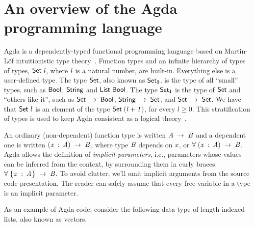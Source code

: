 \documentclass[review]{elsarticle}
\theoremstyle{definition}
\renewcommand{\geq}{\geqslant}
\newcommand{\D}[1]{\blue{\mathsf{#1}}}
\newcommand{\V}[1]{\purple{\mathit{#1}}}
\begin{document}

\section{An overview of the Agda programming language}\label{sec:agda}



Agda is a dependently-typed functional programming language based on
Martin-L\"of intuitionistic type theory~\cite{Lof98}.  Function types
and an infinite hierarchy of types of types, \ensuremath{\D{Set}\;\V{l}}, where \ensuremath{\V{l}} is a
natural number, are built-in. Everything else is a user-defined
type. The type \ensuremath{\D{Set}}, also known as \ensuremath{\D{Set}_{\D{0}}}, is the type of all
``small'' types, such as \ensuremath{\D{Bool}}, \ensuremath{\D{String}} and \ensuremath{\D{List}\;\D{Bool}}.  The type
\ensuremath{\D{Set}_{\D{1}}} is the type of \ensuremath{\D{Set}} and ``others like it'', such as \ensuremath{\D{Set}\;\to \;\D{Bool}},
\ensuremath{\D{String}\;\to \;\D{Set}}, and \ensuremath{\D{Set}\;\to \;\D{Set}}. We have that \ensuremath{\D{Set}\;\V{l}} is an
element of the type \ensuremath{\D{Set}\;(\V{l+1})}, for every $l \geq 0$. This
stratification of types is used to keep Agda consistent as a logical
theory~\cite{Sorensen2006}.

An ordinary (non-dependent) function type is written \ensuremath{\V{A}\;\to \;\V{B}} and a
dependent one is written \ensuremath{(\V{x}\;\mathbin{:}\;\V{A})\;\to \;\V{B}}, where type \ensuremath{\V{B}} depends on
\ensuremath{\V{x}}, or \ensuremath{\D{\forall}\;(\V{x}\;\mathbin{:}\;\V{A})\;\to \;\V{B}}. Agda allows the definition of \emph{implicit
parameters}, i.e.,  parameters whose values can be inferred from the
context, by surrounding them in curly braces: \ensuremath{\D{\forall}\;\{\mskip1.5mu \V{x}\;\mathbin{:}\;\V{A}\mskip1.5mu\}\;\to \;\V{B}}. To
avoid clutter, we'll omit implicit arguments from the source code
presentation. The reader can safely assume that every free variable in
a type is an implicit parameter.

As an example of Agda code, consider the following data type of
length-indexed lists, also known as vectors.
\end{document}
